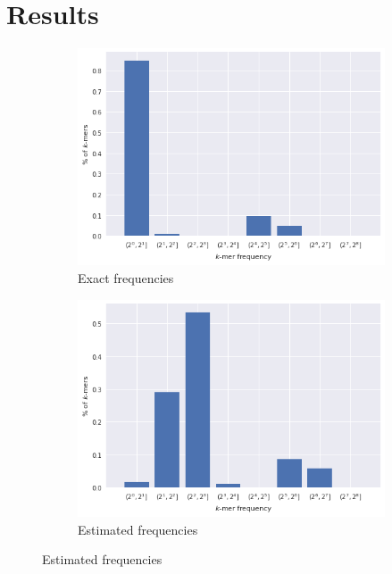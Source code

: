\chapter{Results}

\begin{figure}[htbp]
    \centering
    \begin{subfigure}{.5\textwidth}
        \centering
        \includegraphics[width=\textwidth]{figures/e_coli-kmer_frequencies-exact-K31}
        \caption{Exact frequencies}
    \end{subfigure}%
    \begin{subfigure}{.5\textwidth}
        \centering
        \includegraphics[width=\textwidth]{figures/e_coli-kmer_frequencies-estimated-K31-W20000000}
        \caption{Estimated frequencies}
    \end{subfigure}

\end{figure}
